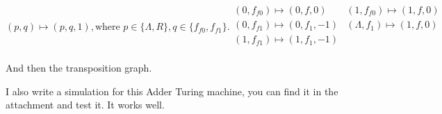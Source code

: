 \documentclass[a4papper]{article}
\theoremstyle{neosn}
\begin{document}
\begin{enumerate}
\[            (p, q) \mapsto (p ,q, 1), \text{where } p \in \{\Lambda, R\}, q \in \{f_{f0}, f_{f1}\}.

            \begin{array}{ll}
                (0, f_{f0}) \mapsto (0, f, 0) & (1, f_{f0}) \mapsto (1, f, 0) \\
                (0, f_{f1}) \mapsto (0, f_{1}, -1) & (\Lambda, f_{1}) \mapsto (1, f, 0) \\
                (1, f_{f1}) \mapsto (1, f_{1}, -1) & \\
            \end{array}
        \]
    \end{enumerate}

    And then the transposition graph.
    

    I also write a simulation for this Adder Turing machine, you can find it in the attachment and
    test it.
    It works well.
\end{document}
